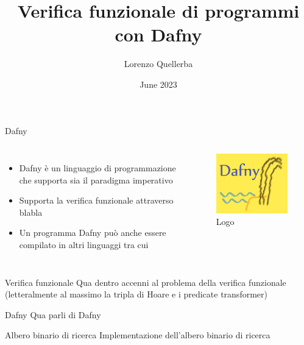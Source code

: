\documentclass{beamer}
\title{Verifica funzionale di programmi con Dafny}
\author{Lorenzo Quellerba}
\institute{Univeristà degli Studi di Torino}
\date{June 2023}
\begin{document}
\maketitle


\begin{frame}{Dafny}
    \begin{columns}[onlytextwidth]
        \begin{itemize}
            \item Dafny è un linguaggio di programmazione che supporta sia il paradigma imperativo
            \item Supporta la verifica funzionale attraverso blabla
            \item Un programma Dafny può anche essere compilato in altri linguaggi tra cui
        \end{itemize}
        \begin{figure}
            \includegraphics[scale=0.45]{./assets/images/dafny-logo-230.png}
            \caption[short]{Logo}
        \end{figure}
    \end{columns}
    
\end{frame}

\begin{frame}{Verifica funzionale}
    Qua dentro accenni al problema della verifica funzionale (letteralmente al massimo la tripla di Hoare e i predicate transformer)
\end{frame}

\begin{frame}{Dafny}
    Qua parli di Dafny
\end{frame}

\begin{frame}{Albero binario di ricerca}
    Implementazione dell'albero binario di ricerca
\end{frame}
\end{document}

